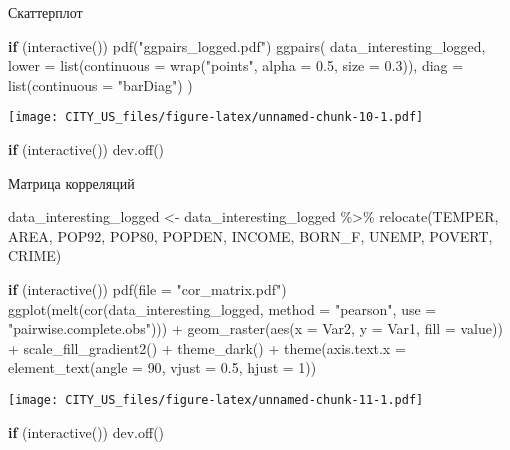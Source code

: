 \documentclass[
]{article}
\newenvironment{Shaded}{\begin{snugshade}}{\end{snugshade}}
\newcommand{\AttributeTok}[1]{\textcolor[rgb]{0.77,0.63,0.00}{#1}}
\newcommand{\ControlFlowTok}[1]{\textcolor[rgb]{0.13,0.29,0.53}{\textbf{#1}}}
\newcommand{\DecValTok}[1]{\textcolor[rgb]{0.00,0.00,0.81}{#1}}
\newcommand{\FloatTok}[1]{\textcolor[rgb]{0.00,0.00,0.81}{#1}}
\newcommand{\FunctionTok}[1]{\textcolor[rgb]{0.00,0.00,0.00}{#1}}
\newcommand{\NormalTok}[1]{#1}
\newcommand{\OtherTok}[1]{\textcolor[rgb]{0.56,0.35,0.01}{#1}}
\newcommand{\SpecialCharTok}[1]{\textcolor[rgb]{0.00,0.00,0.00}{#1}}
\newcommand{\StringTok}[1]{\textcolor[rgb]{0.31,0.60,0.02}{#1}}
\begin{document}
Скаттерплот

\begin{Shaded}
\begin{Highlighting}[]
\ControlFlowTok{if}\NormalTok{ (}\FunctionTok{interactive}\NormalTok{()) }\FunctionTok{pdf}\NormalTok{(}\StringTok{"ggpairs\_logged.pdf"}\NormalTok{)}
\FunctionTok{ggpairs}\NormalTok{(}
\NormalTok{    data\_interesting\_logged,}
    \AttributeTok{lower =} \FunctionTok{list}\NormalTok{(}\AttributeTok{continuous =} \FunctionTok{wrap}\NormalTok{(}\StringTok{"points"}\NormalTok{, }\AttributeTok{alpha =} \FloatTok{0.5}\NormalTok{, }\AttributeTok{size =} \FloatTok{0.3}\NormalTok{)),}
    \AttributeTok{diag =} \FunctionTok{list}\NormalTok{(}\AttributeTok{continuous =} \StringTok{"barDiag"}\NormalTok{)}
\NormalTok{)}
\end{Highlighting}
\end{Shaded}

\texttt{[image: CITY\_US\_files/figure-latex/unnamed-chunk-10-1.pdf]}

\begin{Shaded}
\begin{Highlighting}[]
\ControlFlowTok{if}\NormalTok{ (}\FunctionTok{interactive}\NormalTok{()) }\FunctionTok{dev.off}\NormalTok{()}
\end{Highlighting}
\end{Shaded}

Матрица корреляций

\begin{Shaded}
\begin{Highlighting}[]
\NormalTok{data\_interesting\_logged }\OtherTok{\textless{}{-}}\NormalTok{ data\_interesting\_logged }\SpecialCharTok{\%\textgreater{}\%}
    \FunctionTok{relocate}\NormalTok{(TEMPER, AREA, POP92, POP80, POPDEN, INCOME, BORN\_F, UNEMP, POVERT, CRIME)}

\ControlFlowTok{if}\NormalTok{ (}\FunctionTok{interactive}\NormalTok{()) }\FunctionTok{pdf}\NormalTok{(}\AttributeTok{file =} \StringTok{"cor\_matrix.pdf"}\NormalTok{)}
\FunctionTok{ggplot}\NormalTok{(}\FunctionTok{melt}\NormalTok{(}\FunctionTok{cor}\NormalTok{(data\_interesting\_logged, }\AttributeTok{method =} \StringTok{"pearson"}\NormalTok{, }\AttributeTok{use =} \StringTok{"pairwise.complete.obs"}\NormalTok{))) }\SpecialCharTok{+}
    \FunctionTok{geom\_raster}\NormalTok{(}\FunctionTok{aes}\NormalTok{(}\AttributeTok{x =}\NormalTok{ Var2, }\AttributeTok{y =}\NormalTok{ Var1, }\AttributeTok{fill =}\NormalTok{ value)) }\SpecialCharTok{+}
    \FunctionTok{scale\_fill\_gradient2}\NormalTok{() }\SpecialCharTok{+}
    \FunctionTok{theme\_dark}\NormalTok{() }\SpecialCharTok{+}
    \FunctionTok{theme}\NormalTok{(}\AttributeTok{axis.text.x =} \FunctionTok{element\_text}\NormalTok{(}\AttributeTok{angle =} \DecValTok{90}\NormalTok{, }\AttributeTok{vjust =} \FloatTok{0.5}\NormalTok{, }\AttributeTok{hjust =} \DecValTok{1}\NormalTok{))}
\end{Highlighting}
\end{Shaded}

\texttt{[image: CITY\_US\_files/figure-latex/unnamed-chunk-11-1.pdf]}

\begin{Shaded}
\begin{Highlighting}[]
\ControlFlowTok{if}\NormalTok{ (}\FunctionTok{interactive}\NormalTok{()) }\FunctionTok{dev.off}\NormalTok{()}
\end{Highlighting}
\end{Shaded}
\end{document}
